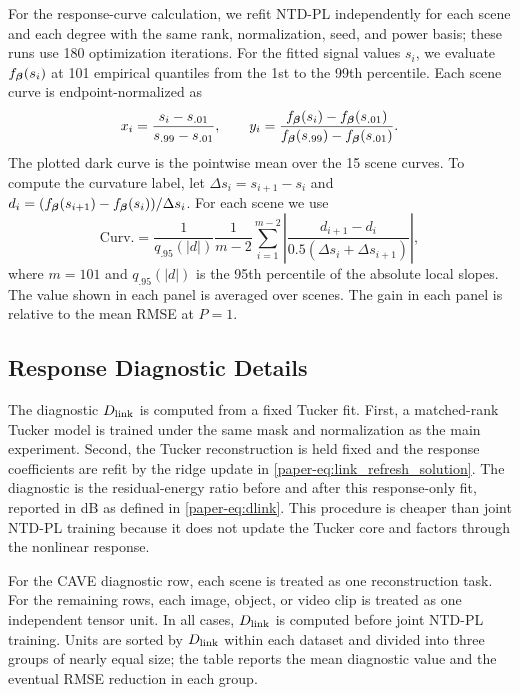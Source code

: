 For the response-curve calculation, we refit NTD-PL independently for each
scene and each degree with the same rank, normalization, seed, and power
basis; these runs use 180 optimization iterations. For the fitted signal
values \(s_i\), we evaluate \(f_{\boldsymbol{\beta}}(s_i)\) at 101 empirical quantiles from
the 1st to the 99th percentile. Each scene curve is endpoint-normalized as
\[
 x_i=\frac{s_i-s_{.01}}{s_{.99}-s_{.01}},\qquad
 y_i=\frac{f_{\boldsymbol{\beta}}(s_i)-f_{\boldsymbol{\beta}}(s_{.01})}
 {f_{\boldsymbol{\beta}}(s_{.99})-f_{\boldsymbol{\beta}}(s_{.01})}.
\]
The plotted dark curve is the pointwise mean over the 15 scene curves. To
compute the curvature label, let \(\Delta s_i=s_{i+1}-s_i\) and
\(d_i=(f_{\boldsymbol{\beta}}(s_{i+1})-f_{\boldsymbol{\beta}}(s_i))/\Delta s_i\). For each scene we use
\[
 \mathrm{Curv.}=
 \frac{1}{q_{.95}(|d|)}
 \frac{1}{m-2}\sum_{i=1}^{m-2}
 \left|\frac{d_{i+1}-d_i}
 {0.5(\Delta s_i+\Delta s_{i+1})}\right|,
\]
where \(m=101\) and \(q_{.95}(|d|)\) is the 95th percentile of the absolute
local slopes. The value shown in each panel is averaged over scenes. The gain
in each panel is relative to the mean RMSE at \(P=1\).





\subsection{Response Diagnostic Details}
\label{supp:diagnostic-details}

The diagnostic $D_{\mathrm{link}}$ is computed from a fixed Tucker fit. First, a
matched-rank Tucker model is trained under the same mask and normalization as
the main experiment. Second, the Tucker reconstruction is held fixed and
the response coefficients are refit by the ridge update in
\eqref{paper-eq:link_refresh_solution}. The diagnostic is the residual-energy
ratio before and after this response-only fit, reported in dB as defined in
\eqref{paper-eq:dlink}. This
procedure is cheaper than joint NTD-PL training because it does not update the
Tucker core and factors through the nonlinear response.

For the CAVE diagnostic row, each scene is treated as one reconstruction task.
For the remaining rows, each image, object,
or video clip is treated as one independent tensor unit. In all cases,
\(D_{\mathrm{link}}\) is computed before joint NTD-PL training. Units are sorted by
\(D_{\mathrm{link}}\) within each dataset and divided into three groups of nearly equal
size; the table reports the mean diagnostic value and the eventual RMSE
reduction in each group.

